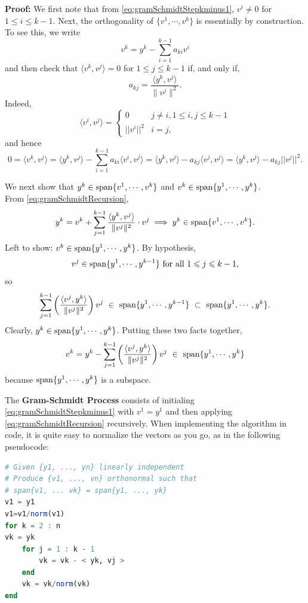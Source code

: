 \textbf{Proof:} We first note that from \eqref{eq:gramSchmidtStepkminus1}, $v^i \neq 0$  for $1 \le i \le k-1$. Next, the orthogonality of $\{ v^1, \cdots, v^{k} \}$ is essentially by construction. To see this, we write
 $$v^k = y^k - \sum_{i=1}^{k-1} a_{ki}v^i	 $$
 and then check that $\langle v^k,v^j \rangle  =0$ for $1 \le j \le  k-1$  if, and only if,
 $$ a_{kj}=	\frac{\langle y^k,v^j \rangle  }{\| v^j \|^2} .$$
 Indeed,  
 $$ \langle  v^i, v^j  \rangle   = \begin{cases}
 0 & j \neq i, 1 \le i,j \le k-1 \\
|| v^i|| ^2 & i = j,
 \end{cases} $$
and hence 
$$0 = \langle v^k, v^j \rangle    = \langle y^k, v^j \rangle   - \sum_{i=1}^{k-1} a_{ki} \langle v^i, v^j \rangle   = \langle y^k, v^j \rangle   -  a_{kj} \langle v^j, v^j \rangle  	=  \langle y^k, v^j \rangle   -  a_{kj} ||v^j||^2. $$ 

 We next show that $y^k \in \mathrm{span} \{  v^1, \cdots, v^k  \}$ and $v^k \in \mathrm{span} \{  y^1, \cdots, y^k  \}$.\\

From \eqref{eq:gramSchmidtRecursion},
\[
	y^k = v^k + \sum_{j=1}^{k-1}
	\frac{\langle y^k,v^j \rangle  }{\| v^j \|^2} \cdot v^j  \implies 
	y^k \in
		\mathrm{span} \{  v^1, \cdots, v^k  \}.
\]
Left to show: $v^k \in \mathrm{span} \{  y^1, \cdots, y^k  \}$. By hypothesis,
\[
	v^j \in \mathrm{span} \{  y^1, \cdots, y^{k-1}  \}
		\mbox{ for all } 1 \leqslant j \leqslant k-1,
\]
so
\[
	\sum_{j=1}^{k-1}
	\left( \frac{\langle v^j,y^k \rangle  }{\| v^j \|^2} \right) v^j \
		\in \ \mathrm{span} \{  y^1, \cdots, y^{k-1}  \} \
		\subset \ \mathrm{span} \{  y^1, \cdots, y^k  \}.
\]
Clearly, $y^k \in \mathrm{span} \{  y^1, \cdots, y^k  \}$. Putting these two facts together, 
\[
 v^k = y^k - \sum_{j=1}^{k-1}
	\left( \frac{\langle v^j,y^k \rangle  }{\| v^j \|^2} \right) v^j \
		\in \ \mathrm{span} \{  y^1, \cdots, y^k  \}
\]
because $\mathrm{span} \{  y^1, \cdots, y^k  \}$ is a subspace. 
\Qed

\vspace*{.2cm}

\begin{definition}
\label{def:ClassicalGS}
The \textbf{Gram-Schmidt Process} consists of initialing \eqref{eq:gramSchmidtStepkminus1} with $v^1 = y^1$ and then applying \eqref{eq:gramSchmidtRecursion} recursively. When implementing the algorithm in code, it is quite easy to normalize the vectors as you go, as in the following pseudocode: 
\begin{lstlisting}[language=Julia,style=mystyle]
# Given {y1, ..., yn} linearly independent
# Produce {v1, ..., vn} orthonormal such that
# span{v1, ... vk} = span{y1, ..., yk}
v1 = y1
v1=v1/norm(v1)
for k = 2 : n
vk = yk
    for j = 1 : k - 1
        vk = vk - < yk, vj > 
    end
    vk = vk/norm(vk)
end
\end{lstlisting}
    
\end{definition} 

